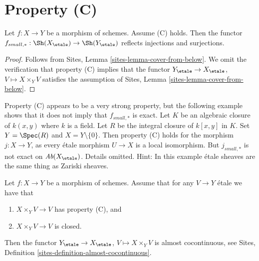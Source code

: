 \section{Property (C)}
\label{section-C}

\begin{lemma}
\label{lemma-property-C-implies}
Let $f : X \to Y$ be a morphism of schemes. Assume (C) holds. Then the functor
$f_{small, *} :
\Sh(X_\etale)
\to
\Sh(Y_\etale)$
reflects injections and surjections.
\end{lemma}

\begin{proof}
Follows from
Sites, Lemma \ref{sites-lemma-cover-from-below}.
We omit the verification that property (C) implies that the functor
$Y_\etale \to X_\etale$, $V \mapsto X \times_Y V$
satisfies the assumption of
Sites, Lemma \ref{sites-lemma-cover-from-below}.
\end{proof}

\begin{remark}
\label{remark-property-C-strong}
Property (C) appears to be a very strong property, but the following
example shows that it does not imply that $f_{small, *}$ is exact.
Let $K$ be an algebraic closure of $k(x, y)$ where $k$ is a field.
Let $R$ be the integral closure of $k[x, y]$ in $K$.
Set $Y = \Spec(R)$ and $X = Y \setminus \{0\}$.
Then property (C) holds for the morphism $j : X \to Y$, as every \'etale
morphism $U \to X$ is a local isomorphism. But $j_{small, *}$ is not exact on
$\textit{Ab}(X_\etale)$. Details omitted. Hint: In this example \'etale
sheaves are the same thing as Zariski sheaves.
\end{remark}

\begin{lemma}
\label{lemma-property-C-closed-implies}
Let $f : X \to Y$ be a morphism of schemes. Assume that
for any $V \to Y$ \'etale we have that
\begin{enumerate}
\item $X \times_Y V \to V$ has property (C), and
\item $X \times_Y V \to V$ is closed.
\end{enumerate}
Then the functor
$Y_\etale \to X_\etale$, $V \mapsto X \times_Y V$
is almost cocontinuous, see
Sites, Definition \ref{sites-definition-almost-cocontinuous}.
\end{lemma}

